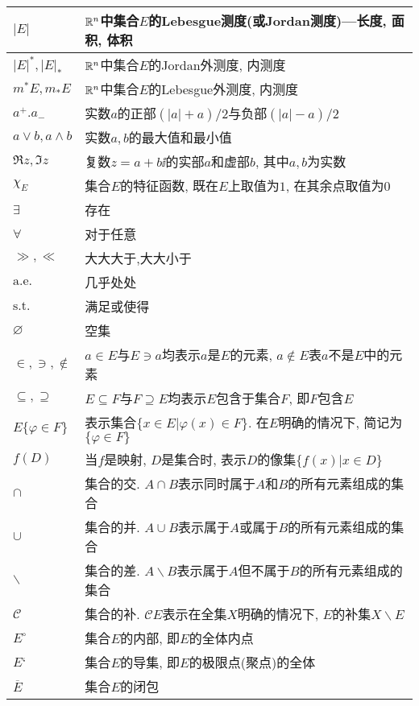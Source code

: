\begin{longtable}{ll}
\(|E|\)&\(\mathbb{R}^n\)中集合\(E\)的Lebesgue测度(或Jordan测度)---长度, 面积, 体积\\\hline
\(|E|^*,|E|_*\)&\(\mathbb{R}^n\)中集合\(E\)的Jordan外测度, 内测度\\\hline
\(m^*E,m_*E\)&\(\mathbb{R}^n\)中集合\(E\)的Lebesgue外测度, 内测度\\\hline
\(a^+.a_-\)&实数\(a\)的正部\(\left(|a|+a\right)/2\)与负部\(\left(|a|-a\right)/2\)\\\hline
\(a\vee b,a\wedge b\)&实数\(a,b\)的最大值和最小值\\\hline
\(\Re z,\Im z\)&复数\(z=a+b\ii\)的实部\(a\)和虚部\(b\), 其中\(a,b\)为实数\\\hline
\(\chi_E\)&集合\(E\)的特征函数, 既在\(E\)上取值为\(1\), 在其余点取值为\(0\)\\\hline
\(\exists\)&存在\\\hline
\(\forall\)&对于任意\\\hline
\(\gg,\ll\)&大大大于,大大小于\\\hline
\(\mathrm{a.e.}\)&几乎处处\\\hline
\(\mathrm{s.t.}\)&满足或使得\\\hline
\(\varnothing\)&空集\\\hline
\(\in,\ni,\notin\)&\(a\in E\)与\(E\ni a\)均表示\(a\)是\(E\)的元素, \(a\notin E\)表\(a\)不是\(E\)中的元素\\\hline
\(\subseteq,\supseteq\)&\(E\subseteq F\)与\(F\supseteq E\)均表示\(E\)包含于集合\(F\), 即\(F\)包含\(E\)\\\hline
\(E\{\varphi\in F\}\)&表示集合\(\{x\in E\big|\varphi(x)\in F\}\). 在\(E\)明确的情况下, 简记为\(\{\varphi\in F\}\)\\\hline
\(f(D)\)&当\(f\)是映射, \(D\)是集合时, 表示\(D\)的像集\(\{f(x)\big|x\in D\}\)\\\hline
\(\cap\)&集合的交. \(A\cap B\)表示同时属于\(A\)和\(B\)的所有元素组成的集合\\\hline
\(\cup\)&集合的并. \(A\cup B\)表示属于\(A\)或属于\(B\)的所有元素组成的集合\\\hline
\(\backslash\)&集合的差. \(A\backslash B\)表示属于\(A\)但不属于\(B\)的所有元素组成的集合\\\hline
\(\mathscr{C}\)&集合的补. \(\mathscr{C}E\)表示在全集\(X\)明确的情况下, \(E\)的补集\(X\backslash E\)\\\hline
\(E^{\circ}\)&集合\(E\)的内部, 即\(E\)的全体内点\\\hline
\(E‘\)&集合\(E\)的导集, 即\(E\)的极限点(聚点)的全体\\\hline
\(\overline{E}\)&集合\(E\)的闭包\\\hline

\end{longtable}

